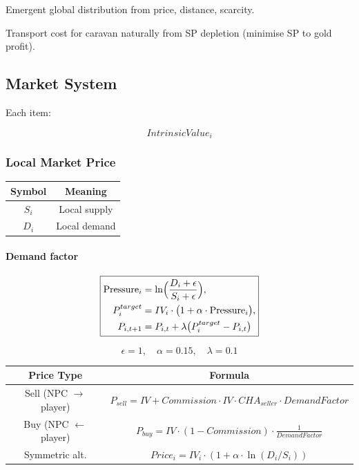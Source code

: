 Emergent global distribution from price, distance, scarcity.

Transport cost for caravan naturally from SP depletion (minimise SP to gold profit).



\subsection{Market System}

Each item:

\begin{equation}
IntrinsicValue_i
\end{equation}



\subsubsection{Local Market Price}

\begin{table}[H]
\centering
\begin{tabular}{|c|c|}
\hline
Symbol & Meaning \\
\hline
$S_i$ & Local supply \\
$D_i$ & Local demand \\
\hline
\end{tabular}
\end{table}

\paragraph{Demand factor}

\[
\boxed{
\begin{aligned}
\text{Pressure}_i &= 
\ln\Bigl(\frac{D_i + \epsilon}{S_i + \epsilon}\Bigr), \\
P^{target}_i &= 
IV_i \cdot \bigl(1 + \alpha \cdot \text{Pressure}_i \bigr), \\
P_{i,t+1} &= 
P_{i,t} + \lambda \bigl(P^{target}_i - P_{i,t}\bigr)
\end{aligned}
}
\]

\[
\epsilon = 1, \quad \alpha = 0.15, \quad \lambda = 0.1
\]



\begin{table}[H]
\centering
\begin{tabular}{|c|c|}
\hline
Price Type & Formula \\
\hline
Sell (NPC $\rightarrow$ player) & 
$P_{sell} = IV + Commission \cdot IV \cdot CHA_{seller} \cdot DemandFactor$ \\

Buy (NPC $\leftarrow$ player) &
$P_{buy} = IV \cdot (1 - Commission) \cdot \frac{1}{DemandFactor}$ \\

Symmetric alt. &
$Price_i = IV_i \cdot (1 + \alpha \cdot \ln(D_i / S_i))$ \\
\hline
\end{tabular}
\end{table}

